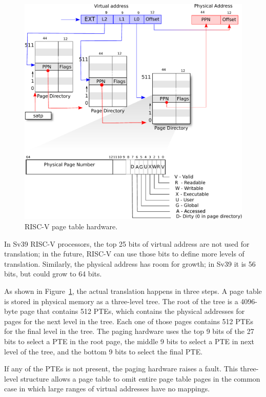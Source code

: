 \begin{figure}[t]
\center
\includegraphics[scale=0.5]{fig/riscv_pagetable.pdf}
\caption{RISC-V page table hardware.}
\label{fig:riscv_pagetable}
\end{figure}

In Sv39 RISC-V processors, the top 25 bits of virtual address are not
used for translation; in the future, RISC-V can use those bits to
define more levels of translation.  Similarly, the physical address
has room for growth; in Sv39 it is 56 bits, but could grow to 64 bits.

As shown in
Figure~\ref{fig:riscv_pagetable},
the actual translation happens in three steps.  A page table is stored
in physical memory as a three-level tree.
The root of the tree is a
4096-byte page that contains 512 PTEs, which contains the physical
addresses for pages for the next level in the tree.  Each one of those
pages contains 512 PTEs for the final level in the tree.  The paging
hardware uses the top 9 bits of the 27 bits to select a PTE in the
root page, the middle 9 bits to select a PTE in next level of the
tree, and the bottom 9 bits to select the final PTE.

If any of the PTEs is not present, the paging hardware raises a fault.
This three-level structure allows a page table to omit entire page
table pages in the common case in which large ranges of virtual
addresses have no mappings.

